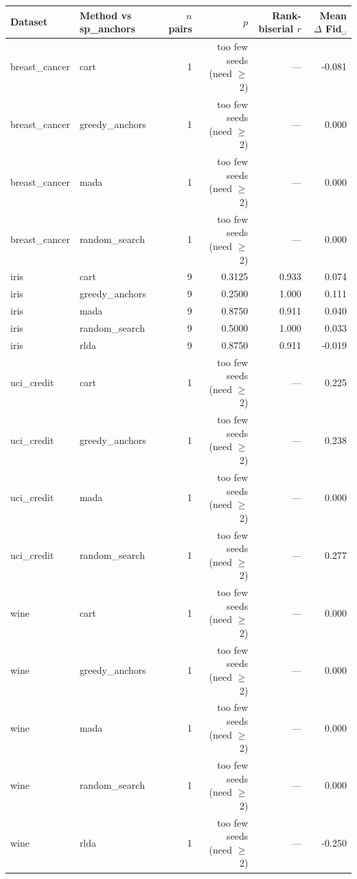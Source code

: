\begin{tabular}{llrrrr}
\toprule
Dataset & Method vs sp_anchors & $n$ pairs & $p$ & Rank-biserial $r$ & Mean $\Delta$ Fid$_\cup$ \\
\midrule
breast_cancer & cart & 1 & too few seeds (need $\geq$ 2) & — & -0.081 \\
breast_cancer & greedy_anchors & 1 & too few seeds (need $\geq$ 2) & — & 0.000 \\
breast_cancer & mada & 1 & too few seeds (need $\geq$ 2) & — & 0.000 \\
breast_cancer & random_search & 1 & too few seeds (need $\geq$ 2) & — & 0.000 \\
iris & cart & 9 & 0.3125 & 0.933 & 0.074 \\
iris & greedy_anchors & 9 & 0.2500 & 1.000 & 0.111 \\
iris & mada & 9 & 0.8750 & 0.911 & 0.040 \\
iris & random_search & 9 & 0.5000 & 1.000 & 0.033 \\
iris & rlda & 9 & 0.8750 & 0.911 & -0.019 \\
uci_credit & cart & 1 & too few seeds (need $\geq$ 2) & — & 0.225 \\
uci_credit & greedy_anchors & 1 & too few seeds (need $\geq$ 2) & — & 0.238 \\
uci_credit & mada & 1 & too few seeds (need $\geq$ 2) & — & 0.000 \\
uci_credit & random_search & 1 & too few seeds (need $\geq$ 2) & — & 0.277 \\
wine & cart & 1 & too few seeds (need $\geq$ 2) & — & 0.000 \\
wine & greedy_anchors & 1 & too few seeds (need $\geq$ 2) & — & 0.000 \\
wine & mada & 1 & too few seeds (need $\geq$ 2) & — & 0.000 \\
wine & random_search & 1 & too few seeds (need $\geq$ 2) & — & 0.000 \\
wine & rlda & 1 & too few seeds (need $\geq$ 2) & — & -0.250 \\
\bottomrule
\end{tabular}

